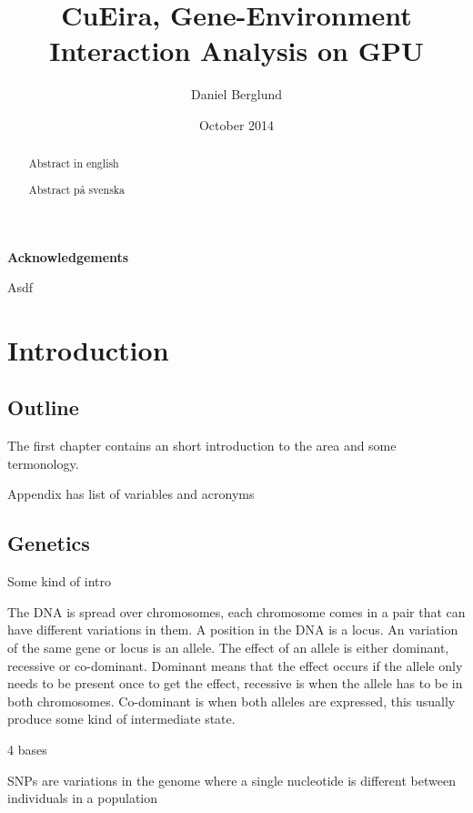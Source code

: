 \documentclass[10pt,a4paper]{report}
\title{CuEira, Gene-Environment Interaction Analysis on GPU}
\author{Daniel Berglund}
\date{October 2014}
\makeatletter
\newcommand\ackname{Acknowledgements}
\newenvironment{acknowledgements}{
      \titlepage
      \null\vfil
      \@beginparpenalty\@lowpenalty
      \begin{center}%
        \bfseries \ackname
        \@endparpenalty\@M
      \end{center}}%
     {\par\vfil\null\endtitlepage}
\newenvironment{acknowledgements}{
      \if@twocolumn
        \section*{\abstractname}
      \else
        \small
        \begin{center}
          {\bfseries \ackname\vspace{-.5em}\vspace{\z@}}
        \end{center}
        \quotation
      \fi}
      {\if@twocolumn\else\endquotation\fi}
\makeatother
\begin{document}
\maketitle
\thispagestyle{empty}

\clearpage
\thispagestyle{empty}
\begin{abstract}
Abstract in english
\end{abstract}

\clearpage
\thispagestyle{empty}
\begin{abstract}
Abstract på svenska
\end{abstract}

\clearpage
\thispagestyle{empty}
\begin{acknowledgements}
Asdf
\end{acknowledgements}

\clearpage
\tableofcontents
\thispagestyle{empty}

\clearpage
\setcounter{page}{1}
\chapter{Introduction}

\section{Outline}
The first chapter contains an short introduction to the area and some termonology.

Appendix has list of variables and acronyms

\section{Genetics}
Some kind of intro

The DNA is spread over chromosomes, each chromosome comes in a pair that can have different variations in them. A position in the DNA is a locus. An variation of the same gene or locus is an allele. The effect of an allele is either dominant, recessive or co-dominant. Dominant means that the effect occurs if the allele only needs to be present once to get the effect, recessive is when the allele has to be in both chromosomes. Co-dominant is when both alleles are expressed, this usually produce some kind of intermediate state.\cite{sadava_life}

4 bases

SNPs are variations in the genome where a single nucleotide is different between individuals in a population\cite{fareed_snp}
\end{document}
